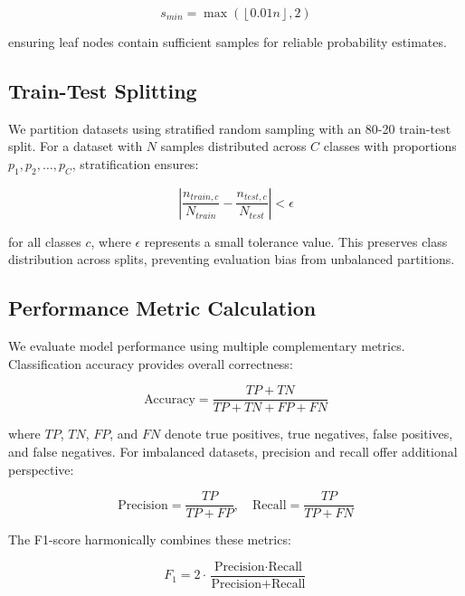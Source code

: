 \documentclass[conference]{IEEEtran}
\begin{document}
\begin{equation}
s_{min} = \max\left(\left\lfloor 0.01n \right\rfloor, 2\right)
\end{equation}

ensuring leaf nodes contain sufficient samples for reliable probability estimates.

\subsection{Train-Test Splitting}

We partition datasets using stratified random sampling with an 80-20 train-test split. For a dataset with $N$ samples distributed across $C$ classes with proportions $p_1, p_2, \ldots, p_C$, stratification ensures:

\begin{equation}
\left|\frac{n_{train,c}}{N_{train}} - \frac{n_{test,c}}{N_{test}}\right| < \epsilon
\end{equation}

for all classes $c$, where $\epsilon$ represents a small tolerance value. This preserves class distribution across splits, preventing evaluation bias from unbalanced partitions.

\subsection{Performance Metric Calculation}

We evaluate model performance using multiple complementary metrics. Classification accuracy provides overall correctness:

\begin{equation}
\text{Accuracy} = \frac{TP + TN}{TP + TN + FP + FN}
\end{equation}

where $TP$, $TN$, $FP$, and $FN$ denote true positives, true negatives, false positives, and false negatives. For imbalanced datasets, precision and recall offer additional perspective:

\begin{equation}
\text{Precision} = \frac{TP}{TP + FP}, \quad \text{Recall} = \frac{TP}{TP + FN}
\end{equation}

The F1-score harmonically combines these metrics:

\begin{equation}
F_1 = 2 \cdot \frac{\text{Precision} \cdot \text{Recall}}{\text{Precision} + \text{Recall}}
\end{equation}
\end{document}
